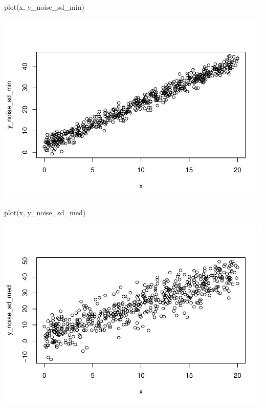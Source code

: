 \documentclass[
]{book}
\newenvironment{Shaded}{\begin{snugshade}}{\end{snugshade}}
\newcommand{\FunctionTok}[1]{\textcolor[rgb]{0.00,0.00,0.00}{#1}}
\newcommand{\NormalTok}[1]{#1}
\begin{document}
\begin{Shaded}
\begin{Highlighting}[]
\FunctionTok{plot}\NormalTok{(x, y\_noise\_sd\_min)}
\end{Highlighting}
\end{Shaded}

\includegraphics{test_course_notes_files/figure-latex/unnamed-chunk-80-2.pdf}

\begin{Shaded}
\begin{Highlighting}[]
\FunctionTok{plot}\NormalTok{(x, y\_noise\_sd\_med)}
\end{Highlighting}
\end{Shaded}

\includegraphics{test_course_notes_files/figure-latex/unnamed-chunk-80-3.pdf}
\end{document}
